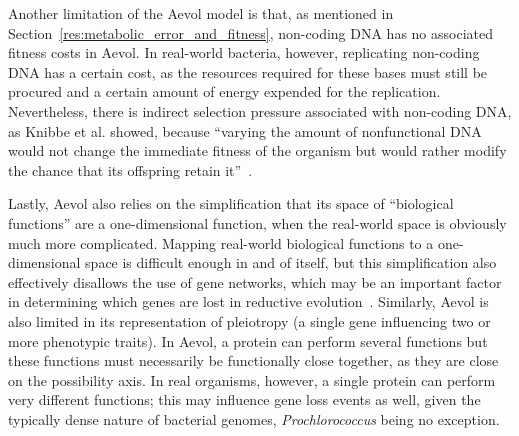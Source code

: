 Another limitation of the Aevol model is that, as mentioned in Section~\ref{res:metabolic_error_and_fitness}, non-coding DNA has no associated fitness costs in Aevol. In real-world bacteria, however, replicating non-coding DNA has a certain cost, as the resources required for these bases must still be procured and a certain amount of energy expended for the replication. Nevertheless, there is indirect selection pressure associated with non-coding DNA, as Knibbe et al. showed, because ``varying the amount of nonfunctional DNA would not change the immediate fitness of the organism but would rather modify the chance that its offspring retain it''~\cite{Knibbe2007}. 

Lastly, Aevol also relies on the simplification that its space of ``biological functions'' are a one-dimensional function, when the real-world space is obviously much more complicated. Mapping real-world biological functions to a one-dimensional space is difficult enough in and of itself, but this simplification also effectively disallows the use of gene networks, which may be an important factor in determining which genes are lost in reductive evolution~\cite{wilcox2003consequences}. Similarly, Aevol is also limited in its representation of pleiotropy (a single gene influencing two or more phenotypic traits). In Aevol, a protein can perform several functions but these functions must necessarily be functionally close together, as they are close on the possibility axis. In real organisms, however, a single protein can perform very different functions; this may influence gene loss events as well, given the typically dense nature of bacterial genomes, \textit{Prochlorococcus} being no exception.